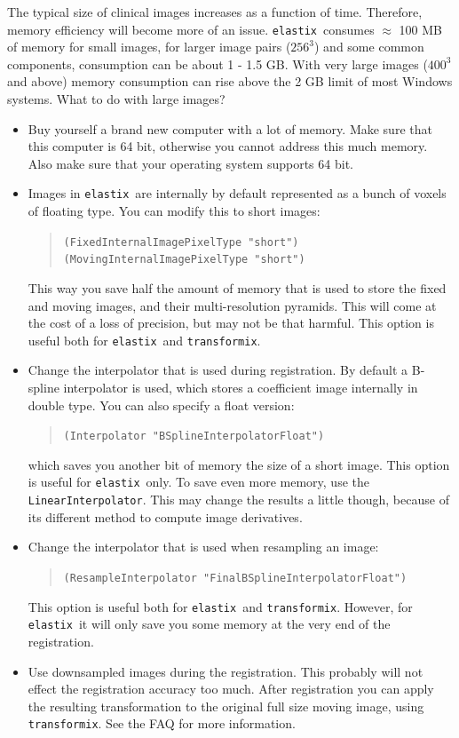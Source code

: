 \documentclass[]{report}
\newcommand{\elastix}{\texttt{elastix}}
\newcommand{\transformix}{\texttt{transformix}}
\begin{document}
The typical size of clinical images increases as a function of time.
Therefore, memory efficiency will become more of an issue. \elastix\
consumes $\approx$ 100 MB of memory for small images, for larger
image pairs ($256^3$) and some common components, consumption can be
about 1 - 1.5 GB. With very large images ($400^3$ and above) memory
consumption can rise above the 2 GB limit of most Windows systems.
What to do with large images?
\begin{itemize}
\item Buy yourself a brand new computer with a lot of memory. Make
sure that this computer is 64 bit, otherwise you cannot address this
much memory. Also make sure that your operating system supports 64
bit.

\item Images in \elastix\ are internally by default represented as a bunch of
voxels of floating type. You can modify this to short images:
\begin{quote}
\texttt{(FixedInternalImagePixelType "short")} \\
\texttt{(MovingInternalImagePixelType "short")}
\end{quote}
This way you save half the amount of memory that is used to store the
fixed and moving images, and their multi-resolution pyramids. This
will come at the cost of a loss of precision, but may not be that
harmful. This option is useful both for \elastix\ and \transformix.

\item Change the interpolator that is used during registration. By default a B-spline
interpolator is used, which stores a coefficient image internally in
double type. You can also specify a float version:
\begin{quote}
\texttt{(Interpolator "BSplineInterpolatorFloat")}
\end{quote}
which saves you another bit of memory the size of a short image.
This option is useful for \elastix\ only. To save even more
memory, use the \texttt{LinearInterpolator}. This may change the
results a little though, because of its different method to
compute image derivatives.

\item Change the interpolator that is used when resampling an image:
\begin{quote}
\texttt{(ResampleInterpolator "FinalBSplineInterpolatorFloat")}
\end{quote}
This option is useful both for \elastix\ and \transformix. However,
for \elastix\ it will only save you some memory at the very end of
the registration.

\item Use downsampled images during the registration. This probably
will not effect the registration accuracy too much. After
registration you can apply the resulting transformation to the
original full size moving image, using \transformix. See the FAQ for
more information.

\end{itemize}
\end{document}
